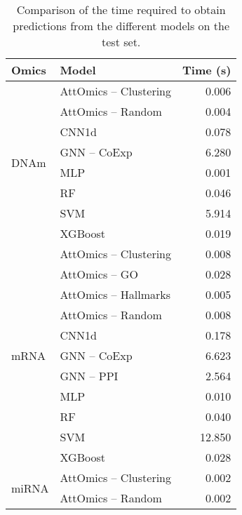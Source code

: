 \begin{table}[htbp]
	\centering
	\caption{Comparison of the time required to obtain predictions from the different models on the test set. }
	\label{tab:arch_timings}
	\begin{tabular}{llr}
		\toprule
		Omics                     & Model                 & Time (s) \\
		\midrule
		\multirow[c]{8}{*}{DNAm}  & AttOmics – Clustering & 0.006    \\
		                          & AttOmics – Random     & 0.004    \\
		                          & CNN1d                 & 0.078    \\
		                          & GNN – CoExp           & 6.280    \\
		                          & MLP                   & 0.001    \\
		                          & RF                    & 0.046    \\
		                          & SVM                   & 5.914    \\
		                          & XGBoost               & 0.019    \\
		\midrule
		\multirow[c]{11}{*}{mRNA} & AttOmics – Clustering & 0.008    \\
		                          & AttOmics – GO         & 0.028    \\
		                          & AttOmics – Hallmarks  & 0.005    \\
		                          & AttOmics – Random     & 0.008    \\
		                          & CNN1d                 & 0.178    \\
		                          & GNN – CoExp           & 6.623    \\
		                          & GNN – PPI             & 2.564    \\
		                          & MLP                   & 0.010    \\
		                          & RF                    & 0.040    \\
		                          & SVM                   & 12.850   \\
		                          & XGBoost               & 0.028    \\
		\midrule
		\multirow[c]{8}{*}{miRNA} & AttOmics – Clustering & 0.002    \\
		                          & AttOmics – Random     & 0.002    \\

\end{tabular}
\end{table}
